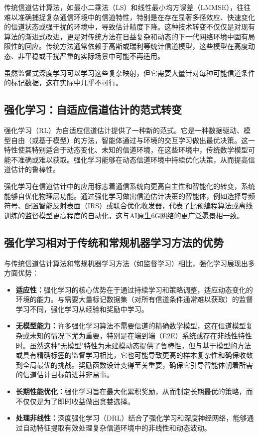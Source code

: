 \documentclass[journal]{IEEEtran}
\begin{document}
传统信道估计算法，如最小二乘法（LS）和线性最小均方误差（LMMSE），往往难以准确捕捉复杂通信环境中的信道特性，特别是在存在显著多径效应、快速变化的信道状态或强干扰的环境中，导致估计精度下降\cite{ref1}。这种技术转变不仅仅是对现有算法的渐进式改进，更是对传统方法在日益复杂和动态的下一代网络环境中固有局限性的回应。传统方法通常依赖于高斯或瑞利等统计信道模型，这些模型在高度动态、非平稳或干扰严重的实际场景中可能不再适用\cite{ref1}。

虽然监督式深度学习可以学习这些复杂映射，但它需要大量针对每种可能信道条件的标记数据，这在实际中几乎不可行。

\subsection{强化学习：自适应信道估计的范式转变}

强化学习（RL）为自适应信道估计提供了一种新的范式。它是一种数据驱动、模型自由（或基于模型）的方法，智能体通过与环境的交互学习做出最优决策\cite{ref7}。这一特性使其特别适合于动态变化、未知的信道环境，在这些环境中，传统数学模型可能不准确或难以获取\cite{ref7}。强化学习能够在动态信道环境中持续优化决策，从而提高信道估计的鲁棒性\cite{ref1}。

强化学习在信道估计中的应用标志着通信系统向更高自主性和智能化的转变，系统能够自优化物理层功能。通过强化学习做出信道估计决策的智能体，例如选择导频符号\cite{ref12}、配置智能反射表面（IRS）\cite{ref1}或联合优化收发器\cite{ref10}，代表了比预编程算法或离线训练的监督模型更高程度的自动化，这与AI原生6G网络的更广泛愿景相一致\cite{ref4}。

\subsection{强化学习相对于传统和常规机器学习方法的优势}

与传统信道估计算法和常规机器学习方法（如监督学习）相比，强化学习展现出多方面优势：

\begin{itemize}
\item \textbf{适应性：}强化学习的核心优势在于通过持续学习和策略调整，适应动态变化的环境的能力\cite{ref1}。与需要大量标记数据集（对所有信道条件通常难以获取）的监督学习不同，强化学习从经验和奖励中学习。
\item \textbf{无模型能力：}许多强化学习算法不需要信道的精确数学模型，这在信道模型复杂或未知的情况下尤为重要，特别是在端到端（E2E）系统或存在非线性特性时\cite{ref7}。虽然这种"无模型"特性为未建模动态提供了鲁棒性，但与基于模型的方法或具有精确标签的监督学习相比，它也可能导致更高的样本复杂性和确保收敛到全局最优的挑战。奖励函数设计变得至关重要，确保它引导智能体朝着所需的信道估计目标前进并非易事\cite{ref7}。
\item \textbf{长期性能优化：}强化学习旨在最大化累积奖励，从而制定长期最优的策略，而不仅仅是为了即时收益做出贪婪选择\cite{ref15}。
\item \textbf{处理非线性：}深度强化学习（DRL）结合了强化学习和深度神经网络，能够通过自动特征提取有效处理复杂信道环境中的非线性和动态波动\cite{ref1}。
\end{itemize}
\end{document}
